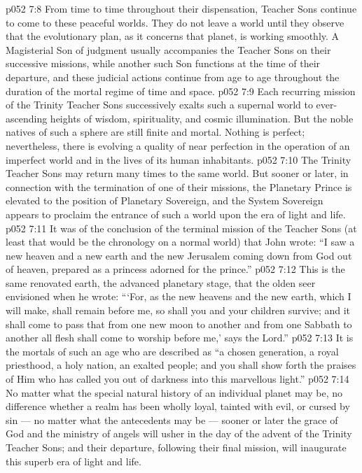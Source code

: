 \vs p052 7:8 \pc From time to time throughout their dispensation, Teacher Sons continue to come to these peaceful worlds. They do not leave a world until they observe that the evolutionary plan, as it concerns that planet, is working smoothly. A Magisterial Son of judgment usually accompanies the Teacher Sons on their successive missions, while another such Son functions at the time of their departure, and these judicial actions continue from age to age throughout the duration of the mortal regime of time and space.
\vs p052 7:9 Each recurring mission of the Trinity Teacher Sons successively exalts such a supernal world to ever\hyp{}ascending heights of wisdom, spirituality, and cosmic illumination. But the noble natives of such a sphere are still finite and mortal. Nothing is perfect; nevertheless, there is evolving a quality of near perfection in the operation of an imperfect world and in the lives of its human inhabitants.
\vs p052 7:10 \pc The Trinity Teacher Sons may return many times to the same world. But sooner or later, in connection with the termination of one of their missions, the Planetary Prince is elevated to the position of Planetary Sovereign, and the System Sovereign appears to proclaim the entrance of such a world upon the era of light and life.
\vs p052 7:11 It was of the conclusion of the terminal mission of the Teacher Sons (at least that would be the chronology on a normal world) that John wrote: “I saw a new heaven and a new earth and the new Jerusalem coming down from God out of heaven, prepared as a princess adorned for the prince.”
\vs p052 7:12 This is the same renovated earth, the advanced planetary stage, that the olden seer envisioned when he wrote: “‘For, as the new heavens and the new earth, which I will make, shall remain before me, so shall you and your children survive; and it shall come to pass that from one new moon to another and from one Sabbath to another all flesh shall come to worship before me,’ says the Lord.”
\vs p052 7:13 It is the mortals of such an age who are described as “a chosen generation, a royal priesthood, a holy nation, an exalted people; and you shall show forth the praises of Him who has called you out of darkness into this marvellous light.”
\vs p052 7:14 \pc No matter what the special natural history of an individual planet may be, no difference whether a realm has been wholly loyal, tainted with evil, or cursed by sin --- no matter what the antecedents may be --- sooner or later the grace of God and the ministry of angels will usher in the day of the advent of the Trinity Teacher Sons; and their departure, following their final mission, will inaugurate this superb era of light and life.
